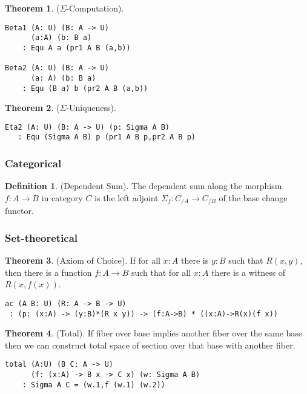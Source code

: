 \documentclass{article}
\theoremstyle{definition}
\newtheorem{theorem}{Theorem}
\newtheorem{definition}{Definition}
\begin{document}
\begin{theorem} ($\Sigma$-Computation).
\begin{lstlisting}
Beta1 (A: U) (B: A -> U)
      (a:A) (b: B a)
    : Equ A a (pr1 A B (a,b))

Beta2 (A: U) (B: A -> U)
      (a: A) (b: B a)
    : Equ (B a) b (pr2 A B (a,b))
\end{lstlisting}
\end{theorem}

\begin{theorem} ($\Sigma$-Uniqueness).
\begin{lstlisting}
Eta2 (A: U) (B: A -> U) (p: Sigma A B)
   : Equ (Sigma A B) p (pr1 A B p,pr2 A B p)
\end{lstlisting}
\end{theorem}

\subsubsection{Categorical}

\begin{definition} (Dependent Sum).
The dependent sum along the morphism $f: A \rightarrow B$ in category $C$ is the left
adjoint $\Sigma_f : C_{/A} \rightarrow C_{/B}$ of the base change functor.
\end{definition}

\subsubsection{Set-theoretical}

\begin{theorem} (Axiom of Choice).
If for all $x : A$ there is $y : B$ such that $R(x,y)$,
then there is a function $f : A \rightarrow B$
such that for all $x : A$ there is a witness of $R(x,f(x))$.
\begin{lstlisting}
ac (A B: U) (R: A -> B -> U)
 : (p: (x:A) -> (y:B)*(R x y)) -> (f:A->B) * ((x:A)->R(x)(f x))
\end{lstlisting}
\end{theorem}

\begin{theorem} (Total).
If fiber over base implies another fiber
over the same base then we can construct total space of section
over that base with another fiber.
\begin{lstlisting}
total (A:U) (B C: A -> U)
      (f: (x:A) -> B x -> C x) (w: Sigma A B)
    : Sigma A C = (w.1,f (w.1) (w.2))
\end{lstlisting}
\end{theorem}
\end{document}
